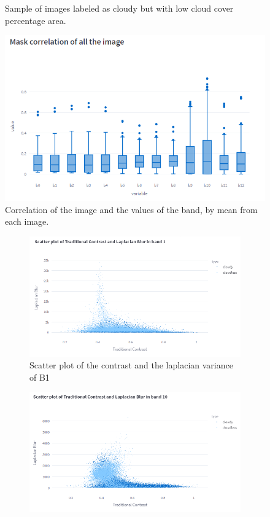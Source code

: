 \documentclass[../main.tex]{subfiles}
\begin{document}
\begin{appendices}
\begin{figure}[H]
	\caption{Sample of images labeled as cloudy but with low cloud cover percentage area.}
	\label{fig:eda-haze-cloudless}
\end{figure}
	\begin{figure}[H]
	\centering
	\includegraphics[width=13cm]{imgs/eda/mask-correlation}
	\caption{Correlation of the image and the values of the band, by mean from each image.}
	\label{fig:eda-mask-correlation-b10}
\end{figure}
	\begin{figure}[H]
	\centering
	\begin{subfigure}[b]{0.85\textwidth}
		\includegraphics[width=\textwidth]{imgs/eda/b1-contrast-blurriness}	
		\caption{Scatter plot of the contrast and the laplacian variance of B1}	
	\end{subfigure}
	\begin{subfigure}[b]{0.85\textwidth}
		\includegraphics[width=\textwidth]{imgs/eda/b10-contrast-blurriness}	

\end{subfigure}
\end{figure}
\end{appendices}
\end{document}
